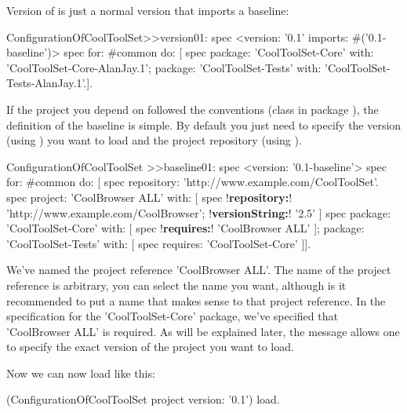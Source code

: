 \documentclass[a4paper,10pt,twoside]{book}
\begin{document}
Version  of  is just a normal version that imports a baseline:
\begin{code}{}
ConfigurationOfCoolToolSet>>version01: spec 
       <version: '0.1' imports: #('0.1-baseline')>
       spec for: #common do: [
              spec 
                     package: 'CoolToolSet-Core' with: 'CoolToolSet-Core-AlanJay.1';
                     package: 'CoolToolSet-Tests' with: 'CoolToolSet-Tests-AlanJay.1'.].       
\end{code}       

\noindent
If the project you depend on followed the  conventions (\ie class  in package ), the definition of the baseline is simple. By default you just need to specify the version (using ) you want to load and the project repository (using ).

\begin{code}{}
ConfigurationOfCoolToolSet >>baseline01: spec 
       <version: '0.1-baseline'>
       spec for: #common do: [
              spec repository: 'http://www.example.com/CoolToolSet'.
              spec project: 'CoolBrowser ALL' with: [
                            spec 
                                 !\textbf{repository:}! 'http://www.example.com/CoolBrowser';
                                 !\textbf{versionString:}! '2.5' ]
              spec 
                     package: 'CoolToolSet-Core' with: [ spec !\textbf{requires:}! 'CoolBrowser ALL' ];
                     package: 'CoolToolSet-Tests' with: [ spec requires: 'CoolToolSet-Core' ]].
\end{code}


We've named the project reference 'CoolBrowser ALL'. The name of the project reference is arbitrary, you can select the name you want, although is it recommended to put a name that makes sense to that project reference.  In the specification for the 'CoolToolSet-Core' package, we've specified that 'CoolBrowser ALL' is required. As will be explained later, the message  allows one to specify the exact version of the project you want to load.

Now we can now load  like this:

\begin{code}{}
(ConfigurationOfCoolToolSet project version: '0.1') load.
\end{code}
\end{document}
